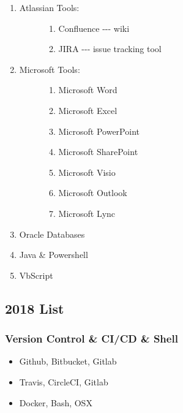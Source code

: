 \begin{enumerate}
\def\labelenumi{\arabic{enumi}.}
\item
  \begin{description}
  \item[Atlassian Tools:]
  \begin{enumerate}
  \def\labelenumii{\arabic{enumii}.}
  
  \item
    Confluence -\/-\/- wiki
  \item
    JIRA -\/-\/- issue tracking tool
  \end{enumerate}
  \end{description}
\item
  \begin{description}
  \item[Microsoft Tools:]
  \begin{enumerate}
  \def\labelenumii{\arabic{enumii}.}
  
  \item
    Microsoft Word
  \item
    Microsoft Excel
  \item
    Microsoft PowerPoint
  \item
    Microsoft SharePoint
  \item
    Microsoft Visio
  \item
    Microsoft Outlook
  \item
    Microsoft Lync
  \end{enumerate}
  \end{description}
\item
  Oracle Databases
\item
  Java \& Powershell
\item
  VbScript
\end{enumerate}


\subsection{2018 List}\label{list}


\subsubsection{Version Control \& CI/CD \&
Shell}\label{version-control-cicd-shell}

\begin{itemize}

\item
  Github, Bitbucket, Gitlab
\item
  Travis, CircleCI, Gitlab
\item
  Docker, Bash, OSX
\end{itemize}


